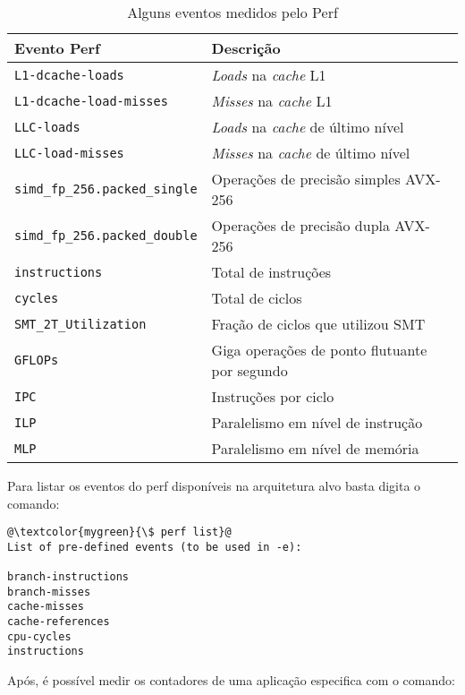 \begin{table}[!htb]
    \centering
    \caption{Alguns eventos medidos pelo Perf}
    \label{tab:perf:events}
    \begin{tabular}{ll}
        \toprule
        Evento Perf     & Descrição                 \\ \midrule

        \texttt{L1-dcache-loads}  & \textit{Loads} na \textit{cache} L1      \\
        \texttt{L1-dcache-load-misses}  & \textit{Misses} na \textit{cache} L1      \\
        \texttt{LLC-loads}  & \textit{Loads} na \textit{cache} de último nível      \\
        \texttt{LLC-load-misses}  & \textit{Misses} na \textit{cache} de último nível      \\
        \midrule
        \texttt{simd\_fp\_256.packed\_single}  & Operações de precisão simples AVX-256  \\
        \texttt{simd\_fp\_256.packed\_double}  & Operações de precisão dupla   AVX-256  \\
        \midrule
        \texttt{instructions}  & Total de instruções \\
        \texttt{cycles}  & Total de ciclos \\
        \midrule
        \texttt{SMT\_2T\_Utilization}  & Fração de ciclos que utilizou SMT \\
        \texttt{GFLOPs}  & Giga operações de ponto flutuante por segundo \\
        \texttt{IPC}  & Instruções por ciclo \\
        \texttt{ILP}  & Paralelismo em nível de instrução \\
        \texttt{MLP}  & Paralelismo em nível de memória \\
         \bottomrule
    \end{tabular}
\end{table}

Para listar os eventos do perf disponíveis na arquitetura alvo basta digita o comando: 
\begin{lstlisting}[frame=none, numbers=none]
@\textcolor{mygreen}{\$ perf list}@
List of pre-defined events (to be used in -e):

branch-instructions
branch-misses
cache-misses
cache-references
cpu-cycles
instructions
\end{lstlisting}

Após, é possível medir os contadores de uma aplicação especifica com o comando: 

